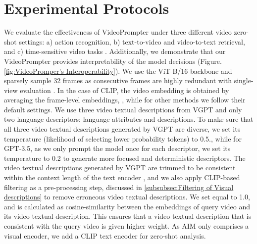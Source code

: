 \documentclass{article} \usepackage{iclr2024_conference,times}
\begin{document}
\section{Experimental Protocols}
\label{headings}
We evaluate the effectiveness of VideoPrompter under three different video zero-shot settings: a) action recognition, b) text-to-video and video-to-text retrieval, and c) time-sensitive video tasks \citep{bagad2023test}. Additionally, we demonstrate that our VideoPrompter provides interpretability of the model decisions (Figure. \ref{fig:VideoPromper's Interoperability}). We use the ViT-B/16 backbone and sparsely sample 32 frames as consecutive frames are highly redundant with single-view evaluation \citep{Rasheed_2023_CVPR}. In the case of CLIP, the video embedding is obtained by averaging the frame-level embeddings, \citep{portillo2021straightforward,Rasheed_2023_CVPR}, while for other methods we follow their default settings. 
We use three video textual descriptions from VGPT and only two language descriptors: language attributes and descriptions. To make sure that all three video textual descriptions generated by VGPT are diverse, we set its temperature (likelihood of selecting lower probability tokens) to 0.5., while for GPT-3.5, as we only prompt the model once for each descriptor, we set its temperature to 0.2 to generate more focused and deterministic descriptors. The video textual descriptions generated by VGPT are trimmed to be consistent within the context length of the text encoder \citep{radford2021learning}, and we also apply CLIP-based filtering as a pre-processing step,  discussed in  \ref{subsubsec:Filtering of Visual descriptions} to remove erroneous video textual descriptions. We set   equal to 1.0, and  is calculated as cosine-similarity between the embeddings of query video and its video textual description. This ensures that a video textual description that is consistent with the query video is given higher weight. As AIM \citep{yang2023aim} only comprises a visual encoder, we add a CLIP text encoder for zero-shot analysis. 
\end{document}

